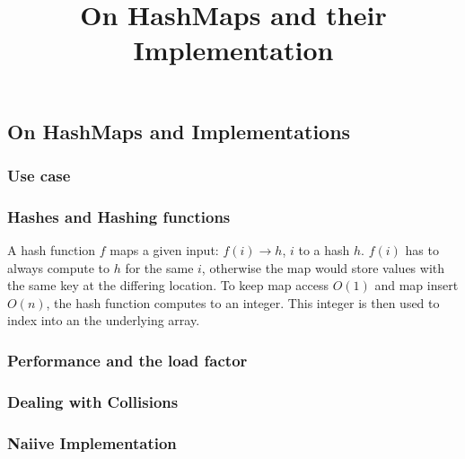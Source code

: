 

\title{On HashMaps and their Implementation}


    \subsection*{On HashMaps and Implementations}

    \subsubsection*{Use case}

    \subsubsection*{Hashes and Hashing functions}

    A hash function $f$ maps a given input: $f(i) \rightarrow h$, $i$ to a hash
    $h$. $f(i)$ has to always compute to $h$ for the same $i$, otherwise the
    map would store values with the same key at the differing location. To keep
    map access $O(1)$ and map insert $O(n)$, the hash function computes to an
    integer. This integer is then used to index into an the underlying array.

    \subsubsection*{Performance and the load factor} 

    \subsubsection*{Dealing with Collisions}

    \subsubsection*{Naiive Implementation}


